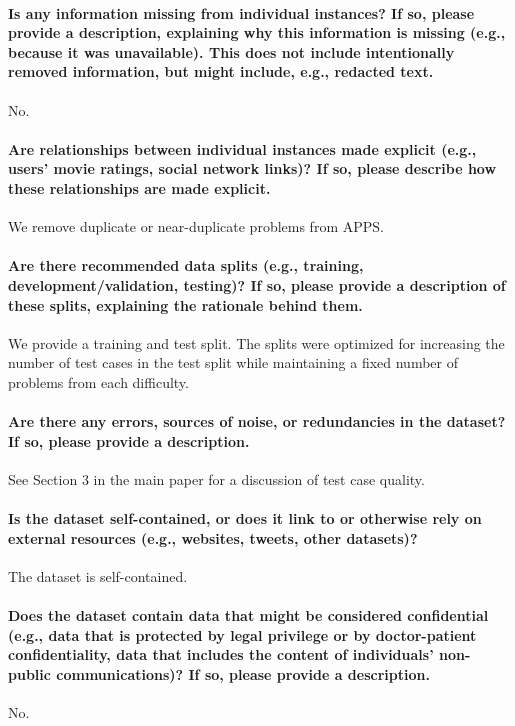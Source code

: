 \paragraph{Is any information missing from individual instances? If so, please
provide a description, explaining why this information is missing (e.g.,
because it was unavailable). This does not include intentionally removed
information, but might include, e.g., redacted text.}
No.

\paragraph{Are relationships between individual instances made explicit
(e.g., users’ movie ratings, social network links)? If so, please describe how these relationships are made explicit.}
We remove duplicate or near-duplicate problems from APPS.

\paragraph{Are there recommended data splits (e.g., training, development/validation,
testing)? If so, please provide a description of these splits, explaining
the rationale behind them.}
We provide a training and test split. The splits were optimized for increasing the number of test cases in the test split while maintaining a fixed number of problems from each difficulty.

\paragraph{Are there any errors, sources of noise, or redundancies in the
dataset? If so, please provide a description.}
See Section 3 in the main paper for a discussion of test case quality.

\paragraph{Is the dataset self-contained, or does it link to or otherwise rely on
external resources (e.g., websites, tweets, other datasets)?}
The dataset is self-contained.

\paragraph{Does the dataset contain data that might be considered confidential (e.g., data that is protected by legal privilege or by doctor-patient confidentiality, data that includes the content of individuals’ non-public communications)? If so, please provide a description.}
No.

